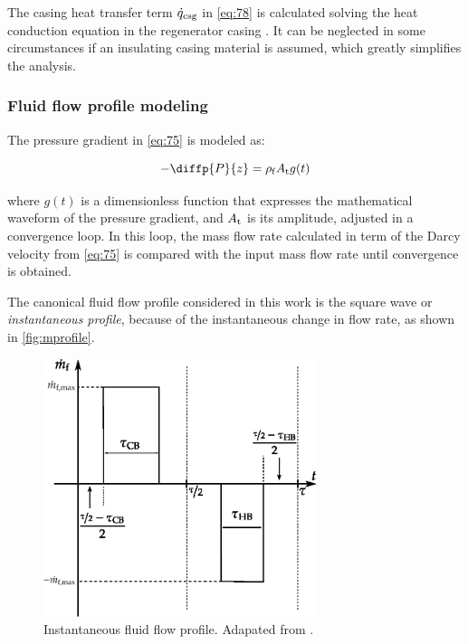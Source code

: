 \documentclass[referee]{svjour3}
\begin{document}
The casing heat transfer term $\dot{q}_{\mathrm{csg}}$ in \autoref{eq:78} is calculated solving the heat conduction equation in the regenerator casing \cite{bib:trevizoli16_perfor_model}. It can be neglected in some circumstances if an insulating casing material is assumed, which greatly simplifies the analysis. 

\subsubsection{Fluid flow profile modeling}
\label{sec:how-fluid-flow}

The pressure gradient in \autoref{eq:75} is modeled as:

\begin{equation}
\label{eq:76}
-\diffp{P}{z} = \rho\ped{f} A\ped{t} g(t)
\end{equation}

\noindent where \(g(t)\) is a dimensionless function that expresses the mathematical waveform of the pressure gradient, and  \(A_{\mathrm{t}}\) is its amplitude,  adjusted in a convergence loop. In this loop, the mass flow rate calculated in term of the Darcy velocity from \autoref{eq:75} is compared with the input   mass flow rate until convergence is obtained. 


The canonical fluid flow profile considered in this work is the square wave or \emph{instantaneous profile}, because of the instantaneous change in flow rate, as shown in \autoref{fig:mprofile}. 

\begin{figure}[!ht]
  \centering
  \includegraphics[width=8cm]{mprofile}
  \caption{Instantaneous fluid flow profile. Adapated from \cite{bib:fortkamp20-desig}.}
  \label{fig:mprofile}
\end{figure}
\end{document}
